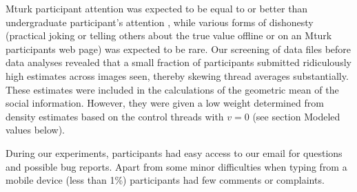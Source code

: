 \documentclass[9pt,a4paper,twocolumn,lineno]{article}
\begin{document}
Mturk participant attention was expected to be equal to or better than undergraduate participant’s attention \cite{hauser2016attentive}, while various forms of dishonesty (practical joking or telling others about the true value offline or on an Mturk participants web page) was expected to be rare. Our screening of data files before data analyses revealed that a small fraction of participants submitted ridiculously high estimates across images seen, thereby skewing thread averages substantially. These estimates were included in the calculations of the geometric mean of the social information. However, they were given a low weight determined from density estimates based on the control threads with $v=0$ (see section Modeled values below).

During our experiments, participants had easy access to our email for questions and possible bug reports. Apart from some minor difficulties when typing from a mobile device (less than 1\%) participants had few comments or complaints.

\end{document}
